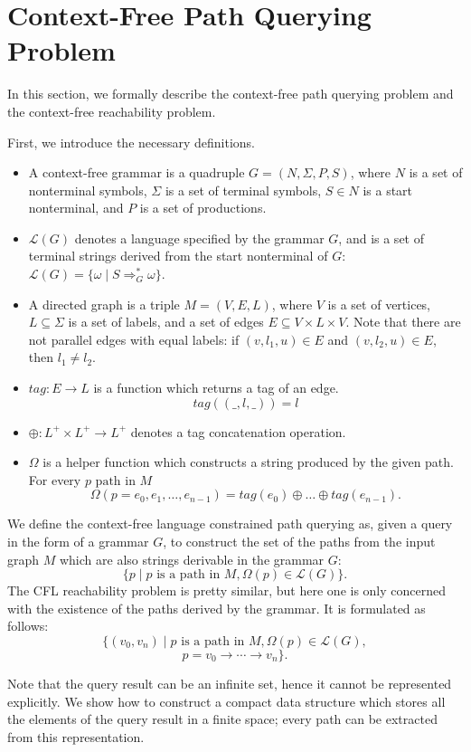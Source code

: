 \section{Context-Free Path Querying Problem}
\label{sec:CFPQ}

In this section, we formally describe the context-free path querying problem and the context-free reachability problem.

First, we introduce the necessary definitions.
\begin{itemize}
  \item A context-free grammar is a quadruple $G=(N, \Sigma, P, S)$, where $N$ is a set of nonterminal symbols, $\Sigma$ is a set of terminal symbols, $S \in N$ is a start nonterminal, and $P$ is a set of productions.
  \item $\mathcal{L}(G)$ denotes a language specified by the grammar $G$, and is a set of terminal strings derived from the start nonterminal of $G$: $\mathcal{L}(G) = \{\omega \mid S \Rightarrow_{G}^{*} \omega\}$.
  \item A directed graph is a triple $M = (V,E,L)$, where $V$ is a set of vertices, $L \subseteq \Sigma$ is a set of labels, and a set of edges $E\subseteq V\times L\times V$.
  Note that there are not parallel edges with equal labels: if $(v, l_1, u) \in E$ and $(v,l_2,u) \in E$, then $l_1 \neq l_2$.
  \item $tag: E \rightarrow L$ is a function which returns a tag of an edge. $$tag((\_,l,\_)) = l$$
  \item $\oplus: L^+ \times L^+ \rightarrow L^+$ denotes a tag concatenation operation.
  \item $\Omega$ is a helper function which constructs a string produced by the given path. For every $p \text{ path in } M$
  $$ \Omega(p = e_{0},e_{1},\dots,e_{n-1}) = tag (e_{0}) \oplus \dots \oplus tag (e_{n-1}).$$
\end{itemize}

We define the context-free language constrained path querying as, given a query in the form of a grammar $G$, to construct the set of the paths from the input graph $M$ which are also strings derivable in the grammar $G$: $$\{p \mid p \text{ is a path in } M, \Omega(p) \in \mathcal{L}(G)\}.$$
The CFL reachability problem is pretty similar, but here one is only concerned with the existence of the paths derived by the grammar. It is formulated as follows:
$$\{ (v_0,v_n) \mid p \text{ is a path in } M, \Omega(p) \in \mathcal{L}(G),$$
$$p = v_0 \rightarrow \cdots \rightarrow v_n\}.$$

Note that the query result can be an infinite set, hence it cannot be represented explicitly.
We show how to construct a compact data structure which stores all the elements of the query result in a finite space; every path can be extracted from this representation.